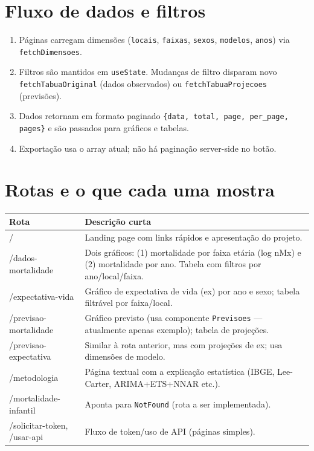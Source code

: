 \documentclass[12pt,a4paper]{article}
\begin{document}
\section{Fluxo de dados e filtros}
\begin{enumerate}[leftmargin=*]
  \item Páginas carregam dimensões (\texttt{locais}, \texttt{faixas}, \texttt{sexos}, \texttt{modelos}, \texttt{anos}) via \texttt{fetchDimensoes}.
  \item Filtros são mantidos em \texttt{useState}. Mudanças de filtro disparam novo \texttt{fetchTabuaOriginal} (dados observados) ou \texttt{fetchTabuaProjecoes} (previsões).
  \item Dados retornam em formato paginado \texttt{\{data, total, page, per\_page, pages\}} e são passados para gráficos e tabelas.
  \item Exportação usa o array atual; não há paginação server-side no botão.
\end{enumerate}

\section{Rotas e o que cada uma mostra}
\begin{longtable}{p{3cm}p{11cm}}
\textbf{Rota} & \textbf{Descrição curta} \\
\hline
/\ & Landing page com links rápidos e apresentação do projeto. \\
/dados-mortalidade & Dois gráficos: (1) mortalidade por faixa etária (log nMx) e (2) mortalidade por ano. Tabela com filtros por ano/local/faixa. \\
/expectativa-vida & Gráfico de expectativa de vida (ex) por ano e sexo; tabela filtrável por faixa/local. \\
/previsao-mortalidade & Gráfico previsto (usa componente \texttt{Previsoes} --- atualmente apenas exemplo); tabela de projeções. \\
/previsao-expectativa & Similar à rota anterior, mas com projeções de ex; usa dimensões de modelo. \\
/metodologia & Página textual com a explicação estatística (IBGE, Lee-Carter, ARIMA+ETS+NNAR etc.). \\
/mortalidade-infantil & Aponta para \texttt{NotFound} (rota a ser implementada). \\
/solicitar-token, /usar-api & Fluxo de token/uso de API (páginas simples). \\
\end{longtable}
\end{document}
